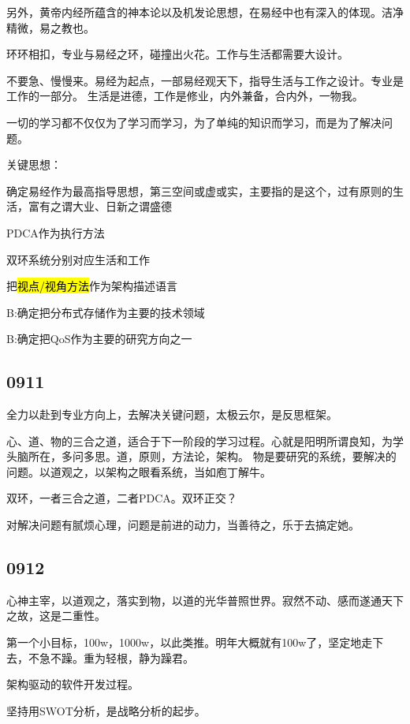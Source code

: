 另外，黄帝内经所蕴含的神本论以及机发论思想，在易经中也有深入的体现。洁净精微，易之教也。

环环相扣，专业与易经之环，碰撞出火花。工作与生活都需要大设计。

不要急、慢慢来。易经为起点，一部易经观天下，指导生活与工作之设计。专业是工作的一部分。
生活是进德，工作是修业，内外兼备，合内外，一物我。

一切的学习都不仅仅为了学习而学习，为了单纯的知识而学习，而是为了解决问题。

关键思想：
\begin{enumbox}
\item 确定易经作为最高指导思想，第三空间或虚或实，主要指的是这个，过有原则的生活，富有之谓大业、日新之谓盛德
\item PDCA作为执行方法
\item 双环系统分别对应生活和工作
\item 把\hl{视点/视角方法}作为架构描述语言
\item B:确定把分布式存储作为主要的技术领域
\item B:确定把QoS作为主要的研究方向之一
\end{enumbox}

\subsection{0911}

全力以赴到专业方向上，去解决关键问题，太极云尔，是反思框架。

心、道、物的三合之道，适合于下一阶段的学习过程。心就是阳明所谓良知，为学头脑所在，多问多思。道，原则，方法论，架构。
物是要研究的系统，要解决的问题。以道观之，以架构之眼看系统，当如庖丁解牛。

双环，一者三合之道，二者PDCA。双环正交？

对解决问题有腻烦心理，问题是前进的动力，当善待之，乐于去搞定她。

\subsection{0912}

心神主宰，以道观之，落实到物，以道的光华普照世界。寂然不动、感而遂通天下之故，这是二重性。

第一个小目标，100w，1000w，以此类推。明年大概就有100w了，坚定地走下去，不急不躁。重为轻根，静为躁君。

架构驱动的软件开发过程。

坚持用SWOT分析，是战略分析的起步。


